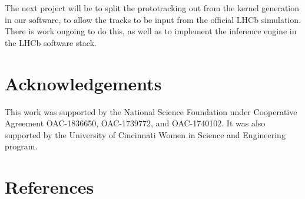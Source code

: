 \documentclass[a4paper]{jpconf}
\begin{document}
The next project will be to split the prototracking out from the kernel generation in our software, to allow the tracks to be input from the official LHCb simulation. There is work ongoing to do this, as well as to implement the inference engine in the LHCb software stack.


\section*{Acknowledgements}

This work was supported by the National Science Foundation under Cooperative Agreement OAC-1836650, OAC-1739772, and OAC-1740102. It was also supported by the University of Cincinnati Women in Science and Engineering program.

\section*{References}


\end{document}
